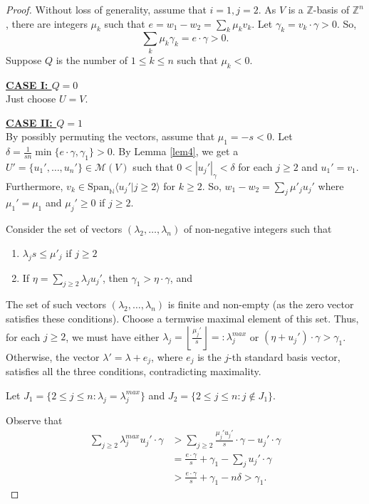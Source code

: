 \documentclass[notitlepage, 10pt]{article}
\theoremstyle{defin}
\theoremstyle{theo}
\theoremstyle{rema}
\newcommand{\N}{\mathbb{N}}
\newcommand{\Z}{\mathbb{Z}}
\newcommand{\cM}{\mathcal{M}}
\begin{document}
\begin{proof}
    Without loss of generality, assume that $i=1, j=2$. As $V$ is a $\Z$-basis of $\Z^n$, there are integers $\mu_k$ such that $e =w_1-w_2 = \sum_k \mu_k v_k$. Let $\gamma_k=v_k\cdot \gamma >0$. So, 
    $$\sum_k \mu_k \gamma_k = e\cdot \gamma>0.$$
    Suppose $Q$ is the number of $1\leq k\leq n$ such that $\mu_k<0$.

\underline{\textbf{CASE I: $Q=0$}} \\
Just choose $U=V$.

\underline{\textbf{CASE II: $Q=1$}} \\
By possibly permuting the vectors, assume that $\mu_1 = -s<0$. Let $\delta = \frac{1}{sn}\min\{e\cdot \gamma, \gamma_1 \}>0$. By Lemma \ref{lem4}, we get a $U'=\{u_1',\ldots,u_n'\}\in \cM(V)$ such that $0<|u_j'|_\gamma<\delta$ for each $j\geq  2$ and $u_1'=v_1$. Furthermore, $v_k \in \mathrm{Span}_\N\langle u_j'|j\geq 2\rangle$ for $k\geq 2$. So, $w_1-w_2 =\sum_j \mu'_j
u_j'$ where $\mu_1'=\mu_1$ and $\mu_j'\geq 0$ if $j\geq 2$.

Consider the set of vectors $(\lambda_2,\ldots, \lambda_n)$ of non-negative integers such that 
\begin{enumerate}
    \item $\lambda_js \leq \mu'_j$ if $j\geq 2$
    \item If $\eta = \sum_{j\geq 2} \lambda_j u_j'$, then $\gamma_1>\eta\cdot \gamma$, and
\end{enumerate}

The set of such vectors $(\lambda_2, \ldots, \lambda_n)$ is finite and non-empty (as the zero vector satisfies these conditions). Choose a termwise maximal element of this set. Thus, for each $j\geq 2$, we must have either $\lambda_j = \left\lfloor\frac{\mu_j'}{s}\right\rfloor =:\lambda_j^{max}$ or $(\eta+u_j')\cdot \gamma > \gamma_1$. Otherwise, the vector $\lambda' = \lambda+e_{j}$, where $e_j$ is the $j$-th standard basis vector, satisfies all the three conditions, contradicting maximality.

Let $J_1 = \{2\leq j \leq n : \lambda_j=\lambda_j^{max}\}$ and $J_2 = \{2\leq j \leq n : j\notin J_1\}$.

Observe that 
\begin{align*}
\sum_{j\geq 2} \lambda_j^{max}u_j'\cdot \gamma
    &> \sum_{j\geq 2} \frac{\mu_j'u_j'}{s}\cdot \gamma - u_j'\cdot \gamma \\
    &= \frac{e\cdot \gamma}{s} + \gamma_1 - \sum_j u_j'\cdot \gamma \\
    &> \frac{e\cdot \gamma}{s} + \gamma_1 - n\delta > \gamma_1.
\end{align*}


\end{proof}
\end{document}
